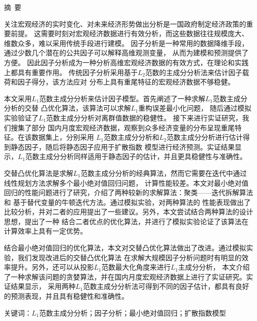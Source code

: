 

\centerline{\large\heiti 摘\ 要}

\vspace{2ex}
关注宏观经济的实时变化、对未来经济形势做出分析是一国政府制定经济政策的重要前提。
这需要时刻对宏观经济数据进行有效分析，而这些数据往往规模庞大、维数众多，难以采用传统手段进行建模。
因子分析是一种常用的数据降维手段，通过少数几个潜在的公共因子可以解释高维观测变量，
从而为建模和预测提供了方便。
因此因子分析成为一种分析高维宏观经济数据的有效方式，在理论和实践上都具有重要作用。
传统因子分析采用基于$L_2$范数的主成分分析法来估计因子载荷和因子得分，该方法应对
分布上具有重尾特征的宏观经济数据不够稳健。

本文采用$L_1$范数主成分分析来估计因子模型。首先阐述了一种求解$L_1$范数主成分分析的交替
凸优化算法，该算法可以求解$L_1$重构误差最小化问题，
随后通过模拟实验验证了$L_1$范数主成分分析对离群值数据的稳健性。
接下来进行实证研究，我们搜集了部分
国内月度宏观经济数据，观察到众多经济变量的分布呈现重尾特征。在该数据集上，分别采用
$L_1$范数主成分分析和$L_2$范数主成分分析进行估计得到静态因子，随后将静态因子应用于扩散指数
模型进行经济预测。实证结果显示，$L_1$范数主成分分析同样适用于静态因子的估计，并且更具稳健性与准确性。

交替凸优化算法是求解$L_1$范数主成分分析的经典算法，然而它需要在迭代中通过线性规划方法求解多个最小绝对值回归问题，
计算性能较差。本文对最小绝对值回归的性能问题进行了研究，介绍了两种较新的求解算法：聚类——迭代拆解算法和
基于替代变量的牛顿迭代方法。通过模拟实验，对两种算法的
性能表现做出了比较分析，并对二者的应用提出了一些建议。另外，本文尝试结合两种算法的设计思想，提出了一种
结合二者优点的优化算法，并进行了模拟实验论证了该算法在计算效率上具有一定优势。

结合最小绝对值回归的优化算法，本文对交替凸优化算法做出了改进。通过模拟实验，我们发现改进后的交替凸优化算法
在求解大规模因子分析问题时有明显的效率提升。另外，还可以从投影$L_1$范数最大化角度来进行$L_1$主成分分析，
本文介绍了一种求解该问题的贪婪算法，并在国内月度宏观经济数据上进行了实证研究。实证结果显示，
采用两种$L_1$范数主成分分析法可得到不同的因子估计，都具有良好的预测表现，并且具有稳健性和准确性。


\vspace{2ex}
{\heiti 关键词}：$L_1$范数主成分分析；因子分析；最小绝对值回归；扩散指数模型
\thispagestyle{plain}

\newpage